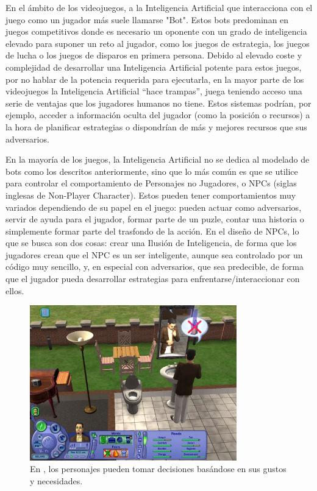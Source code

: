 En el ámbito de los videojuegos, a la Inteligencia Artificial que interacciona con el juego como un jugador más suele llamarse "Bot". Estos bots predominan en juegos competitivos donde es necesario un oponente con un grado de inteligencia elevado para suponer un reto al jugador, como los juegos de estrategia, los juegos de lucha o los juegos de disparos en primera persona. Debido al elevado coste y complejidad de desarrollar una Inteligencia Artificial potente para estos juegos, por no hablar de la potencia requerida para ejecutarla, en la mayor parte de los videojuegos la Inteligencia Artificial ``hace trampas'', juega teniendo acceso una serie de ventajas que los jugadores humanos no tiene. Estos sistemas podrían, por ejemplo, acceder a información oculta del jugador (como la posición o recursos) a la hora de planificar estrategias o dispondrían de más y mejores recursos que sus adversarios. 

En la mayoría de los juegos, la Inteligencia Artificial no se dedica al modelado de bots como los descritos anteriormente, sino que lo más común es que se utilice para controlar el comportamiento de Personajes no Jugadores, o NPCs (siglas inglesas de Non-Player Character). Estos pueden tener comportamientos muy variados dependiendo de su papel en el juego: pueden actuar como adversarios, servir de ayuda para el jugador, formar parte de un puzle, contar una historia o simplemente formar parte del trasfondo de la acción. En el diseño de NPCs, lo que se busca son dos cosas: crear una Ilusión de Inteligencia, de forma que los jugadores crean que el NPC es un ser inteligente, aunque sea controlado por un código muy sencillo, y, en especial con adversarios, que sea predecible, de forma que el jugador pueda desarrollar estrategias para enfrentarse/interaccionar con ellos.

\begin{figure}[h]
	\includegraphics[width=0.8\textwidth]{images/estadodelarte/ai/sims-captura}
	\centering
	\caption{En , los personajes pueden tomar decisiones basándose en sus gustos y necesidades.}
\end{figure}

